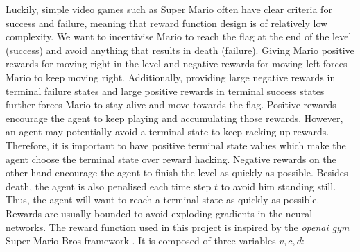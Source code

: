 \documentclass[notitlepage,a4paper,11pt]{article}
\begin{document}
Luckily, simple video games such as Super Mario often have clear criteria for success and failure, meaning that reward function design is of relatively low complexity. We want to incentivise Mario to reach the flag at the end of the level (success) and avoid anything that results in death (failure). Giving Mario positive rewards for moving right in the level and negative rewards for moving left forces Mario to keep moving right. Additionally, providing large negative rewards in terminal failure states and large positive rewards in terminal success states further forces Mario to stay alive and move towards the flag. Positive rewards encourage the agent to keep playing and accumulating those rewards. However, an agent may potentially avoid a terminal state to keep racking up rewards. Therefore, it is important to have positive terminal state values which make the agent choose the terminal state over reward hacking. Negative rewards on the other hand encourage the agent to finish the level as quickly as possible. Besides death, the agent is also penalised each time step $t$ to avoid him standing still. Thus, the agent will want to reach a terminal state as quickly as possible. Rewards are usually bounded to avoid exploding gradients in the neural networks.
\linebreak
The reward function used in this project is inspired by the  \textit{openai gym} Super Mario Bros framework \cite{pypi}. It is composed of three variables $v, c, d$:
\end{document}
